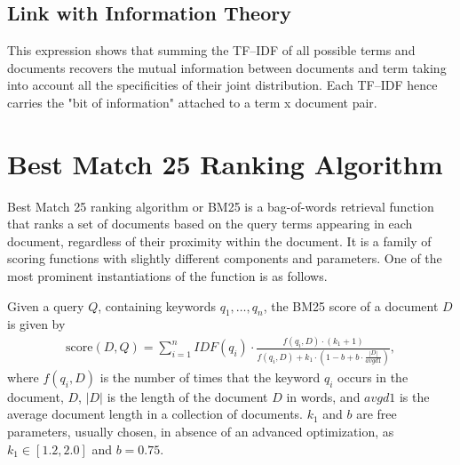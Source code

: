 



\subsection{Link with Information Theory}
This expression shows that summing the TF–IDF of all possible terms and documents recovers the mutual information between documents and term taking into account all the specificities of their joint distribution. Each TF–IDF hence carries the "bit of information" attached to a term x document pair. 


\section{Best Match 25 Ranking Algorithm}
\label{sec:nlp_bm25}
Best Match 25 ranking algorithm or BM25 is a bag-of-words retrieval function that ranks a set of documents based on the query terms appearing in each document, regardless of their proximity within the document. It is a family of scoring functions with slightly different components and parameters. One of the most prominent instantiations of the function is as follows. 

Given a query $Q$, containing keywords $q_1, \dots, q_n$, the BM25 score of a document $D$ is given by
\begin{align*}
	\text{score}(D,Q)=\sum_{i=1}^n IDF(q_i)\cdot \frac{f(q_i, D)\cdot (k_1+1)}{f(q_i, D)+k_1\cdot (1-b+b\cdot\frac{|D|}{avgd1})},
\end{align*}
where $f(q_i, D)$ is the number of times that the keyword $q_i$ occurs in the document, $D$, $|D|$ is the length of the document $D$ in words, and $avgd1$ is the average document length in a collection of documents. $k_1$ and $b$ are free parameters, usually chosen, in absence of an advanced optimization, as $k_1\in [1.2, 2.0]$ and $b=0.75$.


